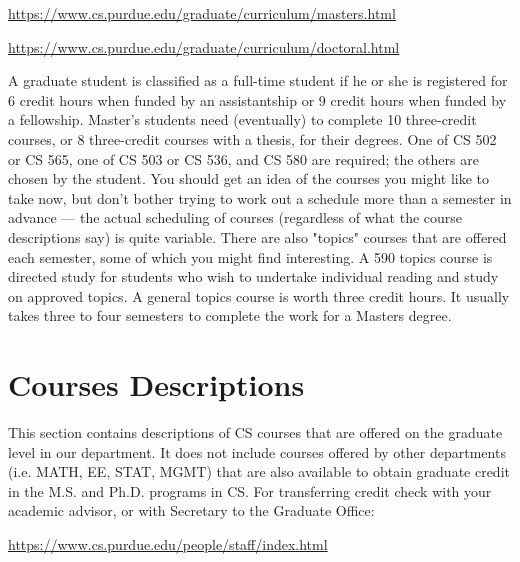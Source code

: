 \centerline{\url{https://www.cs.purdue.edu/graduate/curriculum/masters.html}}
\vspace{\baselineskip}

\centerline{\url{https://www.cs.purdue.edu/graduate/curriculum/doctoral.html}}
\vspace{\baselineskip}

A graduate student is classified as a full-time student if he or she is registered for 6 credit hours when funded by an assistantship or 9 credit hours when funded by a fellowship. Master's students need (eventually) to complete 10 three-credit courses, or 8 three-credit courses with a thesis, for their degrees. One of CS 502 or CS 565, one of CS 503 or CS 536, and CS 580 are required; the others are chosen by the student. You should get an idea of the courses you might like to take now, but don't bother trying to work out a schedule more than a semester in advance --- the actual scheduling of courses (regardless of what the course descriptions say) is quite variable. There are also "topics" courses that are offered each semester, some of which you might find interesting. A 590 topics course is directed study for students who wish to undertake individual reading and study on approved topics. A general topics course is worth three credit hours. It usually takes three to four semesters to complete the work for a Masters degree.



\section{Courses Descriptions}

This section contains descriptions of CS courses that are offered on the graduate level in our department. It does not include courses offered by other departments (i.e. MATH, EE, STAT, MGMT) that are also available to obtain graduate credit in the M.S. and Ph.D. programs in CS. For transferring credit check with your academic advisor, or with Secretary to the Graduate Office:

\centerline{\url{https://www.cs.purdue.edu/people/staff/index.html}}
\vspace{\baselineskip}

